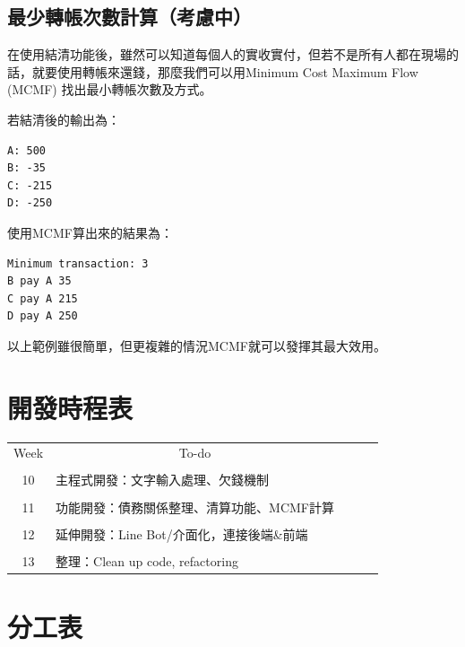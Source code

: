 \documentclass[conference]{IEEEtran}
\begin{document}
\begin{CJK*}{UTF8}{bsmi}
\subsection{最少轉帳次數計算（考慮中）}

在使用結清功能後，雖然可以知道每個人的實收實付，但若不是所有人都在現場的話，就要使用轉帳來還錢，那麼我們可以用Minimum Cost Maximum Flow (MCMF) 找出最小轉帳次數及方式。

若結清後的輸出為：
\begin{lstlisting}
A: 500
B: -35
C: -215
D: -250
\end{lstlisting}
使用MCMF算出來的結果為：
\begin{lstlisting}
Minimum transaction: 3
B pay A 35
C pay A 215
D pay A 250
\end{lstlisting}
以上範例雖很簡單，但更複雜的情況MCMF就可以發揮其最大效用。

\section*{開發時程表}

\begin{table}[hbt!]
\begin{tabular}{|c|l|lll}
\cline{1-2}
    \\[-1em]
    Week & \multicolumn{1}{c|}{To-do}    &  &  &  \\ \cline{1-2}
    \\[-1em]
10   & 主程式開發：文字輸入處理、欠錢機制             &  &  &  \\ \cline{1-2}
\\[-1em]
11   & 功能開發：債務關係整理、清算功能、MCMF計算       &  &  &  \\ \cline{1-2}
\\[-1em]
12   & 延伸開發：Line Bot/介面化，連接後端\&前端    &  &  &  \\ \cline{1-2}
\\[-1em]
13   & 整理：Clean up code, refactoring &  &  &  \\ \cline{1-2}
\end{tabular}
\end{table}

\section*{分工表}


\end{CJK*}
\end{document}
